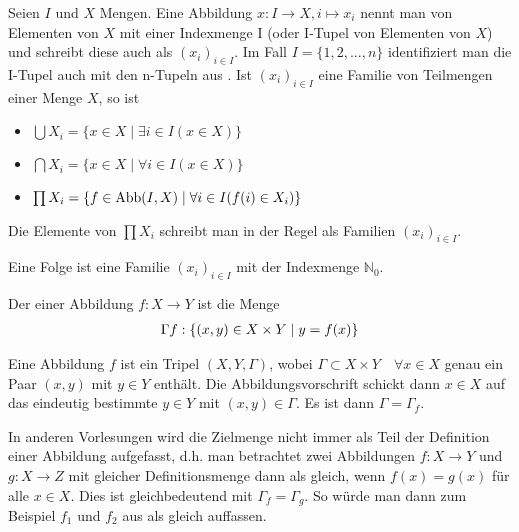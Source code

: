 \begin{definition}[Familie]
	Seien $I$ und $X$ Mengen. Eine Abbildung $x: I \to X, i \mapsto
	x_i$ nennt man  von Elementen von $X$ mit einer Indexmenge I (oder I-Tupel von 
	Elementen von $X$) und schreibt diese auch als $(x_i)_{i \in I}$. Im Fall $I=\{1,2,...,n\}$
	identifiziert man die I-Tupel auch mit den n-Tupeln aus . Ist $(x_i)_{i \in I}$ eine Familie von
	Teilmengen einer Menge $X$, so ist 
	\begin{itemize}
		\item $\bigcup X_i = \{x \in X \mid \exists i \in I(x \in X)\}$
		\item $\bigcap X_i = \{x \in X \mid \forall i \in I(x \in X)\}$
		\item $\prod X_i = \{f \in \operatorname{Abb}(I,X) \mid \forall i \in I(f(i) \in X_i)\}$
	\end{itemize}
	Die Elemente von $\prod X_i$ schreibt man in der Regel als Familien $(x_i)_{i \in I}$.
\end{definition}

\begin{example}
	Eine Folge ist eine Familie $(x_i)_{i \in I}$ mit der Indexmenge $\mathbb{N}_0$.
\end{example}

\begin{definition}[Graph]
	Der  einer Abbildung $f: X \to Y$ ist die Menge
	\begin{align}
		\Gamma f: \{(x,y) \in X \times Y \mid y=f(x)\}\notag
	\end{align}
\end{definition}

\begin{remark}
	Eine Abbildung $f$ ist ein Tripel $(X,Y,\Gamma)$, wobei $\Gamma \subset X \times Y \quad \forall
	x \in X$ genau ein Paar $(x,y)$ mit $y \in Y$ enthält. Die Abbildungsvorschrift schickt dann
	$x \in X$ auf das eindeutig bestimmte $y \in Y$ mit $(x,y) \in \Gamma$. Es ist dann $\Gamma =
	\Gamma_f$.
\end{remark}

\begin{remark}
	In anderen Vorlesungen wird die Zielmenge nicht immer als Teil der Definition einer Abbildung aufgefasst, d.h. man betrachtet zwei Abbildungen $f:X\to Y$ und $g:X\to Z$ mit gleicher Definitionsmenge dann als gleich, wenn $f(x)=g(x)$ für alle $x\in X$. Dies ist gleichbedeutend mit $\Gamma_f=\Gamma_g$. So würde man dann zum Beispiel $f_1$ und $f_2$ aus  als gleich auffassen.
\end{remark}